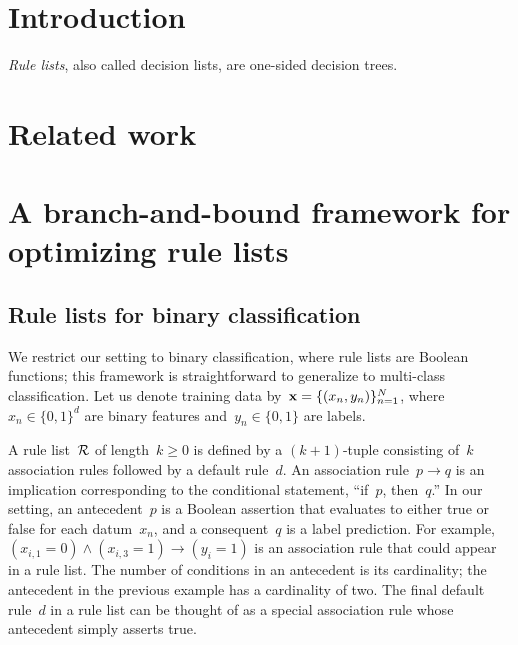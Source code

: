 \section{Introduction}

\emph{Rule lists}, also called decision lists, are one-sided decision trees.

\section{Related work}

\citep{rivest:1987}

\citep{LethamRuMcMa15}

\citep{YangRuSe16}

\citep{garofalakis:2000-kdd,garofalakis:2000-sigkdd,garofalakis:2003}

\section{A branch-and-bound framework for optimizing rule lists}

\subsection{Rule lists for binary classification}

We restrict our setting to binary classification,
where rule lists are Boolean functions;
this framework is straightforward to generalize to multi-class classification.
%
Let us denote training data by~$\mathbf{x} = {\{(x_n, y_n)\}_{n=1}^N}$,
where~${x_n \in \{0, 1\}^d}$ are binary features and~${y_n \in \{0, 1\}}$ are labels.

A rule list~${\mathcal R}$ of length~$k \ge 0$ is defined by a $(k+1)$-tuple consisting of~$k$
association rules followed by a default rule~$d$.
%
An association rule~${p \rightarrow q}$ is an implication corresponding to the
conditional statement, ``if~$p$, then~$q$.''
%
In our setting, an antecedent~$p$ is a Boolean assertion that evaluates to either
true or false for each datum~$x_n$, and a consequent~$q$ is a label prediction.
%
For example,~${(x_{i, 1} = 0) \wedge (x_{i, 3} = 1) \rightarrow (y_i = 1)}$
is an association rule that could appear in a rule list.
%
The number of conditions in an antecedent is its cardinality;
the antecedent in the previous example has a cardinality of two.
%
The final default rule~$d$ in a rule list can be thought of as a special
association rule whose antecedent simply asserts true.

